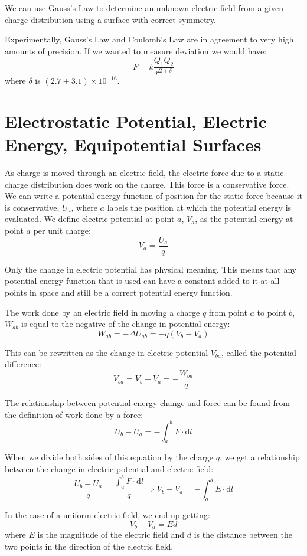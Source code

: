 \documentclass[../introphysics.tex]{subfiles}
\begin{document}
We can use Gauss's Law to determine an unknown electric field from a given charge distribution using a surface with correct symmetry. 

Experimentally, Gauss's Law and Coulomb's Law are in agreement to very high amounts of precision. 
If we wanted to measure deviation we would have:
\[F=k\frac{Q_1Q_2}{r^{2+\delta}}\]
where $\delta$ is $(2.7\pm 3.1)\times10^{-16}$.

\section{Electrostatic Potential, Electric Energy, Equipotential Surfaces}
As charge is moved through an electric field, the electric force due to a 
static charge distribution does work on the charge. This force is a conservative
force. We can write a potential energy function of position for the static
force because it is conservative, $U_a$, where $a$ labels the position at 
which the potential energy is evaluated. We define electric potential at point
$a$, $V_a$, as the potential energy at point $a$ per unit charge:
\[V_a=\frac{U_a}{q}\]

Only the change in electric potential has physical meaning. This means that 
any potential energy function that is used can have a constant added to it
at all points in space and still be a correct potential energy function.

The work done by an electric field in moving a charge $q$ from point $a$ to 
point $b$, $W_{ab}$ is equal to the negative of the change in potential energy:
\[W_{ab}=-\Delta U_{ab}=-q(V_b-V_a)\]

This can be rewritten as the change in electric potential $V_{ba}$, called the
potential difference:
\[V_{ba}=V_b-V_a=-\frac{W_{ba}}{q}\]

The relationship between potential energy change and force can be found from the
definition of work done by a force:
\[U_b-U_a=-\int_a^bF\cdot\mathrm{d}l\]

When we divide both sides of this equation by the charge $q$, we get a relationship
between the change in electric potential and electric field:
\[\frac{U_b-U_a}{q}=\frac{\int_a^b F\cdot\mathrm{d}l}{q}\Rightarrow V_b-V_a=-\int_a^b E\cdot\mathrm{d}l\]

In the case of a uniform electric field, we end up getting:
\[V_b-V_a=Ed\]
where $E$ is the magnitude of the electric field and $d$ is the distance between
the two points in the direction of the electric field.
\end{document}
